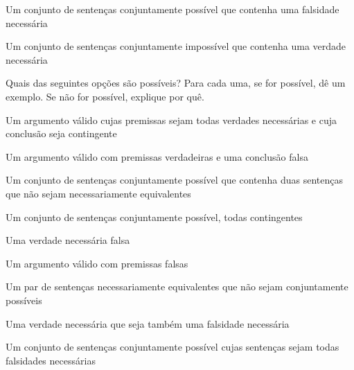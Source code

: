 \begin{compactlist}
\item Um conjunto de sentenças conjuntamente possível que contenha uma falsidade necessária
\item[] 
\item Um conjunto de sentenças conjuntamente impossível que contenha uma verdade necessária
\item[] 
\end{compactlist}

\problempart
Quais das seguintes opções são possíveis? Para cada uma, se for possível, dê um exemplo. Se não for possível, explique por quê.

\begin{compactlist}
\item Um argumento válido cujas premissas sejam todas verdades necessárias e cuja conclusão seja contingente
\item Um argumento válido com premissas verdadeiras e uma conclusão falsa
\item Um conjunto de sentenças conjuntamente possível que contenha duas sentenças que não sejam necessariamente equivalentes
\item Um conjunto de sentenças conjuntamente possível, todas contingentes
\item Uma verdade necessária falsa
\item Um argumento válido com premissas falsas
\item Um par de sentenças necessariamente equivalentes que não sejam conjuntamente possíveis
\item Uma verdade necessária que seja também uma falsidade necessária
\item Um conjunto de sentenças conjuntamente possível cujas sentenças sejam todas falsidades necessárias
\end{compactlist}

